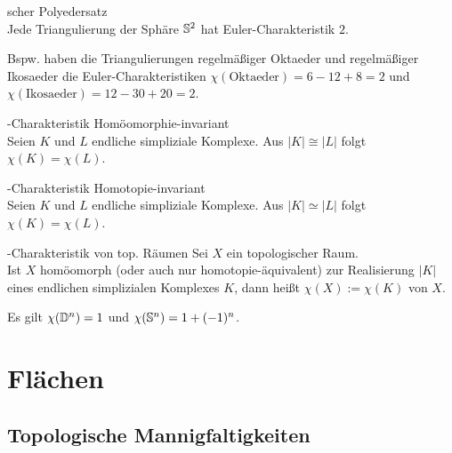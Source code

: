 \linie

\begin{Satz}{scher Polyedersatz}\\
    Jede Triangulierung der Sphäre $\mathbb{S}^2$ hat Euler-Charakteristik $2$.
\end{Satz}

\begin{Bsp}
    Bspw. haben die Triangulierungen regelmäßiger Oktaeder und
    regelmäßiger Ikosaeder die Euler-Charakteristiken
    $\chi(\text{Oktaeder}) = 6 - 12 + 8 = 2$ und
    $\chi(\text{Ikosaeder}) = 12 - 30 + 20 = 2$.
\end{Bsp}

\linie

\begin{Satz}{-Charakteristik Homöomorphie-invariant}\\
    Seien $K$ und $L$ endliche simpliziale Komplexe.
    Aus $|K| \cong |L|$ folgt $\chi(K) = \chi(L)$.
\end{Satz}

\begin{Satz}{-Charakteristik Homotopie-invariant}\\
    Seien $K$ und $L$ endliche simpliziale Komplexe.
    Aus $|K| \simeq |L|$ folgt $\chi(K) = \chi(L)$.
\end{Satz}

\begin{Def}{-Charakteristik von top. Räumen}
    Sei $X$ ein topologischer Raum. \\
    Ist $X$ homöomorph (oder auch nur homotopie-äquivalent) zur Realisierung
    $|K|$ eines endlichen simplizialen Komplexes $K$, dann heißt
    $\chi(X) := \chi(K)$  von $X$.
\end{Def}

\begin{Bsp}
    Es gilt $\chi(\mathbb{D}^n) = 1$ und $\chi(\mathbb{S}^n) = 1 + (-1)^n$.
\end{Bsp}

\pagebreak

\section{%
    Flächen%
}

\subsection{%
    Topologische Mannigfaltigkeiten%
}

